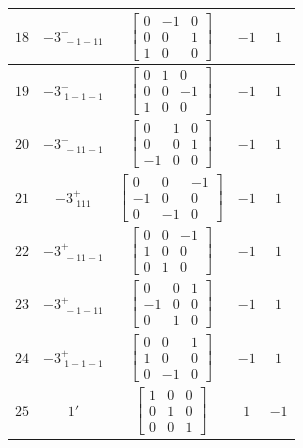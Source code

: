 \documentclass[fleqn,8pt]{jsarticle}
\begin{document}
\begin{longtable}{ccccc}
$ 18 $ & $ -3^{-}_{\,\,-1-11} $ & $ \begin{bmatrix} 0 & -1 & 0 \\ 0 & 0 & 1 \\ 1 & 0 & 0 \end{bmatrix} $ & $ -1 $ & $ 1 $ \\ \hline
$ 19 $ & $ -3^{-}_{\,\,1-1-1} $ & $ \begin{bmatrix} 0 & 1 & 0 \\ 0 & 0 & -1 \\ 1 & 0 & 0 \end{bmatrix} $ & $ -1 $ & $ 1 $ \\ \hline
$ 20 $ & $ -3^{-}_{\,\,-11-1} $ & $ \begin{bmatrix} 0 & 1 & 0 \\ 0 & 0 & 1 \\ -1 & 0 & 0 \end{bmatrix} $ & $ -1 $ & $ 1 $ \\ \hline
$ 21 $ & $ -3^{+}_{\,\,111} $ & $ \begin{bmatrix} 0 & 0 & -1 \\ -1 & 0 & 0 \\ 0 & -1 & 0 \end{bmatrix} $ & $ -1 $ & $ 1 $ \\ \hline
$ 22 $ & $ -3^{+}_{\,\,-11-1} $ & $ \begin{bmatrix} 0 & 0 & -1 \\ 1 & 0 & 0 \\ 0 & 1 & 0 \end{bmatrix} $ & $ -1 $ & $ 1 $ \\ \hline
$ 23 $ & $ -3^{+}_{\,\,-1-11} $ & $ \begin{bmatrix} 0 & 0 & 1 \\ -1 & 0 & 0 \\ 0 & 1 & 0 \end{bmatrix} $ & $ -1 $ & $ 1 $ \\ \hline
$ 24 $ & $ -3^{+}_{\,\,1-1-1} $ & $ \begin{bmatrix} 0 & 0 & 1 \\ 1 & 0 & 0 \\ 0 & -1 & 0 \end{bmatrix} $ & $ -1 $ & $ 1 $ \\ \hline
$ 25 $ & $ 1{}' $ & $ \begin{bmatrix} 1 & 0 & 0 \\ 0 & 1 & 0 \\ 0 & 0 & 1 \end{bmatrix} $ & $ 1 $ & $ -1 $ \\ \hline

\end{longtable}
\end{document}
